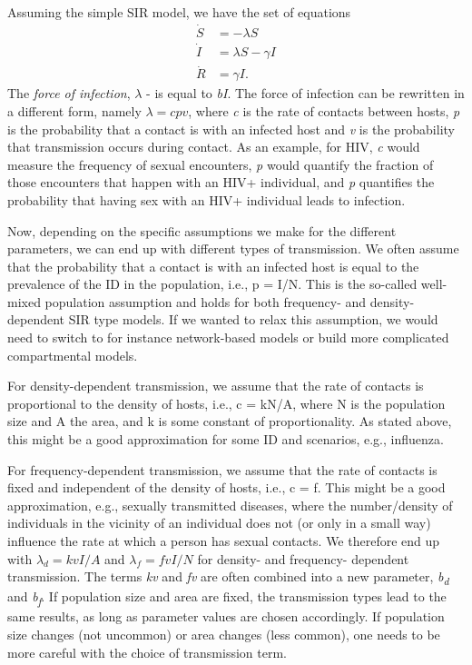 \documentclass[]{book}
\theoremstyle{definition}
\theoremstyle{definition}
\theoremstyle{definition}
\theoremstyle{remark}
\begin{document}
Assuming the simple SIR model, we have the set of equations \[ 
\begin{aligned}
\dot S &= - \lambda S \\
\dot I &= \lambda S  - \gamma I \\
\dot R &= \gamma I.
\end{aligned}
\] The \emph{force of infection}, \(\lambda\) - is equal to \emph{bI}.
The force of infection can be rewritten in a different form, namely
\(\lambda= cpv\), where \emph{c} is the rate of contacts between hosts,
\emph{p} is the probability that a contact is with an infected host and
\emph{v} is the probability that transmission occurs during contact. As
an example, for HIV, \emph{c} would measure the frequency of sexual
encounters, \emph{p} would quantify the fraction of those encounters
that happen with an HIV+ individual, and \emph{p} quantifies the
probability that having sex with an HIV+ individual leads to infection.

Now, depending on the specific assumptions we make for the different
parameters, we can end up with different types of transmission. We often
assume that the probability that a contact is with an infected host is
equal to the prevalence of the ID in the population, i.e., p = I/N. This
is the so-called well-mixed population assumption and holds for both
frequency- and density-dependent SIR type models. If we wanted to relax
this assumption, we would need to switch to for instance network-based
models or build more complicated compartmental models.

For density-dependent transmission, we assume that the rate of contacts
is proportional to the density of hosts, i.e., c = kN/A, where N is the
population size and A the area, and k is some constant of
proportionality. As stated above, this might be a good approximation for
some ID and scenarios, e.g., influenza.

For frequency-dependent transmission, we assume that the rate of
contacts is fixed and independent of the density of hosts, i.e., c = f.
This might be a good approximation, e.g., sexually transmitted diseases,
where the number/density of individuals in the vicinity of an individual
does not (or only in a small way) influence the rate at which a person
has sexual contacts. We therefore end up with \(\lambda_d= kv I/A\) and
\(\lambda_f= fv I/N\) for density- and frequency- dependent
transmission. The terms \emph{kv} and \emph{fv} are often combined into
a new parameter, \emph{b\textsubscript{d}} and
\emph{b\textsubscript{f}}. If population size and area are fixed, the
transmission types lead to the same results, as long as parameter values
are chosen accordingly. If population size changes (not uncommon) or
area changes (less common), one needs to be more careful with the choice
of transmission term.
\end{document}
